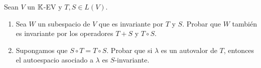 \item Sean $V$ un $\mathbb{K}$-EV y $T,S\in L(V)$.
    \begin{enumerate}
        \item Sea $W$ un subespacio de $V$ que es invariante por $T$ y $S$. Probar que $W$ también es invariante por los operadores $T+S$ y $T\circ S$.
            \begin{mdframed}[style=s]
                
            \end{mdframed}
        \item Supongamos que $S\circ T=T\circ S$. Probar que si $\lambda$ es un autovalor de $T$, entonces el autoespacio asociado a $\lambda$ es $S$-invariante.
            \begin{mdframed}[style=s]
                
            \end{mdframed}
    \end{enumerate}